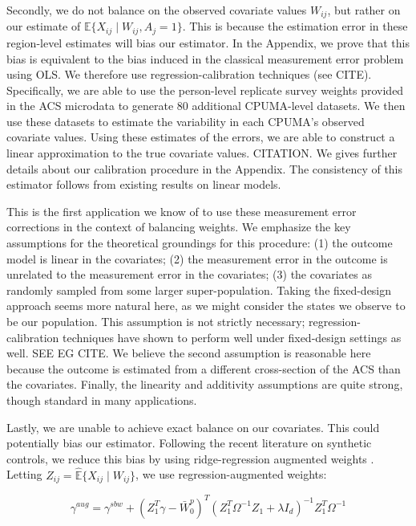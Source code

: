 \documentclass[12pt]{article}
\begin{document}
Secondly, we do not balance on the observed covariate values $W_{ij}$, but rather on our estimate of $\mathbb{E}\{X_{ij} \mid W_{ij}, A_j = 1\}$. This is because the estimation error in these region-level estimates will bias our estimator. In the Appendix, we prove that this bias is equivalent to the bias induced in the classical measurement error problem using OLS. We therefore use regression-calibration techniques (see CITE). Specifically, we are able to use the person-level replicate survey weights provided in the ACS microdata to generate 80 additional CPUMA-level datasets. We then use these datasets to estimate the variability in each CPUMA's observed covariate values. Using these estimates of the errors, we are able to construct a linear approximation to the true covariate values. CITATION. We gives further details about our calibration procedure in the Appendix. The consistency of this estimator follows from existing results on linear models. 

This is the first application we know of to use these measurement error corrections in the context of balancing weights. We emphasize the key assumptions for the theoretical groundings for this procedure: (1) the outcome model is linear in the covariates; (2) the measurement error in the outcome is unrelated to the measurement error in the covariates; (3) the covariates as randomly sampled from some larger super-population. Taking the fixed-design approach seems more natural here, as we might consider the states we observe to be our population. This assumption is not strictly necessary; regression-calibration techniques have shown to perform well under fixed-design settings as well. SEE EG CITE. We believe the second assumption is reasonable here because the outcome is estimated from a different cross-section of the ACS than the covariates. Finally, the linearity and additivity assumptions are quite strong, though standard in many applications.

Lastly, we are unable to achieve exact balance on our covariates. This could potentially bias our estimator. Following the recent literature on synthetic controls, we reduce this bias by using ridge-regression augmented weights \cite{ben2018augmented}. Letting $Z_{ij} = \hat{\mathbb{E}}\{X_{ij} \mid W_{ij}\}$, we use regression-augmented weights:

$$
\gamma^{aug} = \gamma^{sbw} + (Z_1^T\gamma - \bar{W}_0^p)^T(Z_1^T\Omega^{-1}Z_1 + \lambda I_d)^{-1}Z_1^T\Omega^{-1}
$$
\end{document}
